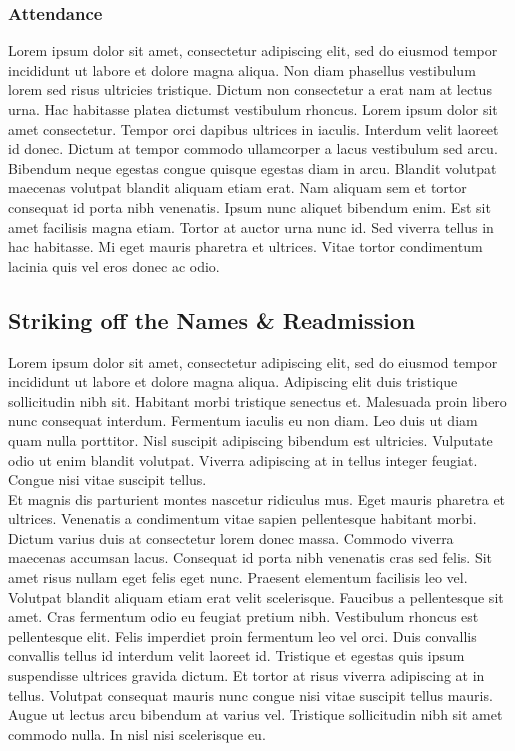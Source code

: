 \documentclass{article}
\begin{document}
\subsubsection{Attendance} 
Lorem ipsum dolor sit amet, consectetur adipiscing elit, sed do eiusmod tempor incididunt ut labore et dolore magna aliqua. Non diam phasellus vestibulum lorem sed risus ultricies tristique. Dictum non consectetur a erat nam at lectus urna. Hac habitasse platea dictumst vestibulum rhoncus. Lorem ipsum dolor sit amet consectetur. Tempor orci dapibus ultrices in iaculis. Interdum velit laoreet id donec. Dictum at tempor commodo ullamcorper a lacus vestibulum sed arcu. Bibendum neque egestas congue quisque egestas diam in arcu. Blandit volutpat maecenas volutpat blandit aliquam etiam erat. Nam aliquam sem et tortor consequat id porta nibh venenatis. Ipsum nunc aliquet bibendum enim. Est sit amet facilisis magna etiam. Tortor at auctor urna nunc id. Sed viverra tellus in hac habitasse. Mi eget mauris pharetra et ultrices. Vitae tortor condimentum lacinia quis vel eros donec ac odio.
\subsection{Striking off the Names \& Readmission}
Lorem ipsum dolor sit amet, consectetur adipiscing elit, sed do eiusmod tempor incididunt ut labore et dolore magna aliqua. Adipiscing elit duis tristique sollicitudin nibh sit. Habitant morbi tristique senectus et. Malesuada proin libero nunc consequat interdum. Fermentum iaculis eu non diam. Leo duis ut diam quam nulla porttitor. Nisl suscipit adipiscing bibendum est ultricies. Vulputate odio ut enim blandit volutpat. Viverra adipiscing at in tellus integer feugiat. Congue nisi vitae suscipit tellus.\\

Et magnis dis parturient montes nascetur ridiculus mus. Eget mauris pharetra et ultrices. Venenatis a condimentum vitae sapien pellentesque habitant morbi. Dictum varius duis at consectetur lorem donec massa. Commodo viverra maecenas accumsan lacus. Consequat id porta nibh venenatis cras sed felis. Sit amet risus nullam eget felis eget nunc. Praesent elementum facilisis leo vel. Volutpat blandit aliquam etiam erat velit scelerisque. Faucibus a pellentesque sit amet. Cras fermentum odio eu feugiat pretium nibh. Vestibulum rhoncus est pellentesque elit. Felis imperdiet proin fermentum leo vel orci. Duis convallis convallis tellus id interdum velit laoreet id. Tristique et egestas quis ipsum suspendisse ultrices gravida dictum. Et tortor at risus viverra adipiscing at in tellus. Volutpat consequat mauris nunc congue nisi vitae suscipit tellus mauris. Augue ut lectus arcu bibendum at varius vel. Tristique sollicitudin nibh sit amet commodo nulla. In nisl nisi scelerisque eu.\\
\end{document}
